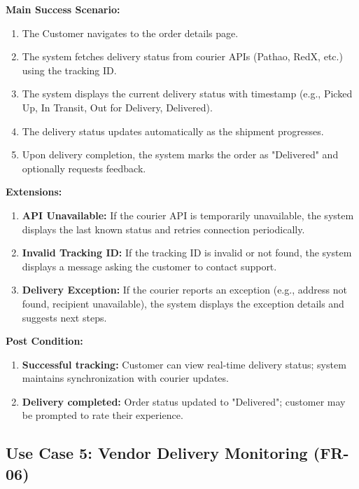 \textbf{Main Success Scenario:}
\begin{enumerate}
    \item The Customer navigates to the order details page.
    \item The system fetches delivery status from courier APIs (Pathao, RedX, etc.) using the tracking ID.
    \item The system displays the current delivery status with timestamp (e.g., Picked Up, In Transit, Out for Delivery, Delivered).
    \item The delivery status updates automatically as the shipment progresses.
    \item Upon delivery completion, the system marks the order as "Delivered" and optionally requests feedback.
\end{enumerate}

\textbf{Extensions:}
\begin{enumerate}
    \item[2a.] \textbf{API Unavailable:} If the courier API is temporarily unavailable, the system displays the last known status and retries connection periodically.
    \item[2b.] \textbf{Invalid Tracking ID:} If the tracking ID is invalid or not found, the system displays a message asking the customer to contact support.
    \item[3a.] \textbf{Delivery Exception:} If the courier reports an exception (e.g., address not found, recipient unavailable), the system displays the exception details and suggests next steps.
\end{enumerate}

\textbf{Post Condition:}
\begin{enumerate}
    \item \textbf{Successful tracking:} Customer can view real-time delivery status; system maintains synchronization with courier updates.
    \item \textbf{Delivery completed:} Order status updated to "Delivered"; customer may be prompted to rate their experience.
\end{enumerate}


\subsection*{Use Case 5: Vendor Delivery Monitoring (FR-06)}

